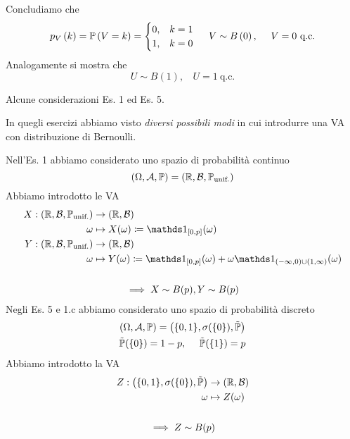 \begin{enumerate}
Concludiamo che
\begin{equation*}
p_{V}\left(k\right) =\mathbb{P}\left(V=k\right) =
\begin{cases}
0, & k=1\\
1, & k=0
\end{cases}
 \ \ \ \ V\sim B\left(0\right) ,\ \ \ \ V=0\ \text{q.c.}
\end{equation*}
Analogamente si mostra che
\begin{equation*}
U\sim B(1) ,\ \ \ \ U=1\ \text{q.c.}
\end{equation*}
\end{enumerate}
\begin{oss}
Alcune considerazioni Es. 1 ed Es. 5.

In quegli esercizi abbiamo visto \textit{diversi possibili modi} in cui introdurre una VA con distribuzione di Bernoulli.

Nell'Es. 1 abbiamo considerato uno spazio di probabilità continuo
\begin{equation*}
(\Omega,\mathcal{A},\mathbb{P}) =(\mathbb{R} ,\mathcal{B} ,\mathbb{P}_{\text{unif.}})
\end{equation*}
Abbiamo introdotto le VA
\begin{gather*}
\begin{aligned}
X:(\RR ,\mathcal{B} ,\PP_{\text{unif.}}) & \rightarrow (\RR ,\mathcal{B})\\
\omega  & \mapsto X(\omega) \coloneqq \Ind_{[0,p]}(\omega)\\
Y:(\RR ,\mathcal{B} ,\PP_{\text{unif.}}) & \rightarrow (\RR ,\mathcal{B})\\
\omega  & \mapsto Y(\omega) \coloneqq \Ind_{[0,p]}(\omega) +\omega \Ind_{(-\infty ,0) \cup (1,\infty)}(\omega)
\end{aligned}\\
\ \\
\implies X\sim B(p) ,Y\sim B(p)
\end{gather*}
Negli Es. 5 e 1.c abbiamo considerato uno spazio di probabilità discreto
\begin{gather*}
(\Omega,\mathcal{A},\mathbb{P}) =\left(\{0,1\} ,\sigma (\{0\}) ,\tilde{\mathbb{P}}\right)\\
\tilde{\mathbb{P}}(\{0\}) =1-p,\ \ \ \ \tilde{\mathbb{P}}(\{1\}) =p
\end{gather*}
Abbiamo introdotto la VA
\begin{gather*}
\begin{aligned}
Z:\left(\{0,1\} ,\sigma (\{0\}) ,\tilde{\mathbb{P}}\right) & \rightarrow (\mathbb{R} ,\mathcal{B})\\
\omega  & \mapsto Z(\omega)
\end{aligned}\\
\\
\implies Z\sim B(p)
\end{gather*}
\end{oss}

